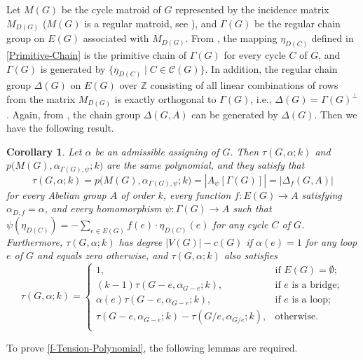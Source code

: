 \documentclass[12pt]{article}%
\numberwithin{equation}{section}
\newtheorem{corollary}[corollary]{Corollary}
\begin{document}
Let $M(G)$ be the cycle matroid of $G$ represented by the incidence matrix $M_{D(G)}$ ($M(G)$ is a regular matroid, see \cite[Proposition 5.1.5]{Oxley2011}), and $\Gamma(G)$ be the regular chain group on $E(G)$ associated with $M_{D(G)}$. From \cite{Tutte1956},  the mapping $\eta_{D(C)}$ defined in \eqref{Primitive-Chain} is the primitive chain of  $\Gamma(G)$ for every cycle $C$ of $G$, and $\Gamma(G)$ is generated by $\big\{\eta_{D(C)}\mid C\in\mathcal{C}(G)\big\}$. In addition, the regular chain group $\Delta(G)$ on $E(G)$ over $\mathbb{Z}$ consisting of all linear combinations of rows from the matrix $M_{D(G)}$ is exactly orthogonal
to  $\Gamma(G)$, i.e., $\Delta(G)=\Gamma(G)^\perp$. Again, from \cite{Tutte1956}, the chain group $\Delta(G,A)$ can be generated by $\Delta(G)$. Then we have the following result.
\begin{corollary}\label{f-Tension-Polynomial}
Let $\alpha$ be an admissible assigning of $G$. Then $\tau(G,\alpha;k)$ and $p\big(M(G),\alpha_{\Gamma(G),\psi};k\big)$ are the same polynomial, and they satisfy that
\[
\tau(G,\alpha;k)=p\big(M(G),\alpha_{\Gamma(G),\psi};k\big)=|A_\psi[\Gamma(G)]|=|\Delta_f(G,A)|
\]
for every Abelian group $A$ of order $k$, every function $f:E(G)\to A$ satisfying $\alpha_{D,f}=\alpha$, and every homomorphism $\psi:\Gamma(G)\to A$ such that  $\psi(\eta_{D(C)})=-\sum_{e\in E(G)}f(e)\cdot\eta_{D(C)}(e) $ for any cycle $C$ of $G$. Furthermore, $\tau(G,\alpha;k)$ has degree $|V(G)|-c(G)$ if $\alpha(e)=1$ for any loop $e$ of $G$ and equals zero otherwise, and $\tau(G,\alpha;k)$ also satisfies
\begin{equation*}
\tau(G,\alpha;k)=
\begin{cases}
1,&\text{if $E(G)=\emptyset$};\\
(k-1)\tau(G-e,\alpha_{G-e};k),&\text{if $e$ is a bridge};\\
\alpha(e)\tau(G-e,\alpha_{G-e};k),&\text{if $e$ is a loop};\\
\tau(G-e,\alpha_{G-e};k)-\tau(G/e,\alpha_{G/e};k),&\text{otherwise}.\\
\end{cases}
\end{equation*}
\end{corollary}

To prove \autoref{f-Tension-Polynomial}, the following lemmas are required.
\end{document}
